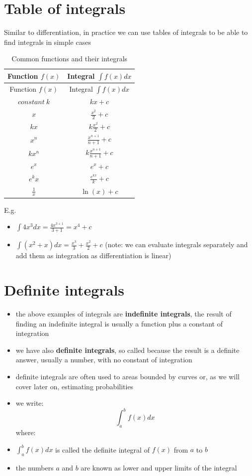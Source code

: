 \documentclass[
]{book}
\providecommand{\tightlist}{%
  \setlength{\itemsep}{0pt}\setlength{\parskip}{0pt}}
\theoremstyle{definition}
\theoremstyle{definition}
\theoremstyle{definition}
\theoremstyle{remark}
\begin{document}
\hypertarget{table-of-integrals}{%
\section{Table of integrals}\label{table-of-integrals}}

Similar to differentiation, in practice we can use tables of integrals to be able to find integrals in simple cases

\begin{longtable}[]{@{}cc@{}}
\caption{\label{tab:int-table} Common functions and their integrals}\tabularnewline
\toprule
Function \(f(x)\) & Integral \(\int f(x) dx\)\tabularnewline
\midrule
\endfirsthead
\toprule
Function \(f(x)\) & Integral \(\int f(x) dx\)\tabularnewline
\midrule
\endhead
\(constant\:k\) & \(kx + c\)\tabularnewline
\(x\) & \(\frac{x^2}{2}+c\)\tabularnewline
\(kx\) & \(k\frac{x^2}{2}+c\)\tabularnewline
\(x^n\) & \(\frac{x^{n+1}}{n+1}+c\)\tabularnewline
\(kx^n\) & \(k\frac{x^{n+1}}{n+1}+c\)\tabularnewline
\(e^x\) & \(e^x+c\)\tabularnewline
\(e^kx\) & \(\frac{e^{kx}}{k}+c\)\tabularnewline
\(\frac{1}{x}\) & \(\ln(x)+c\)\tabularnewline
\bottomrule
\end{longtable}

E.g.

\begin{itemize}
\tightlist
\item
  \(\int 4x^3 dx = \frac{4x^{3+1}}{3+1}=x^4 + c\)
\item
  \(\int (x^2 + x) dx = \frac{x^3}{3} + \frac{x^2}{2} +c\) (note: we can evaluate integrals separately and add them as integration as differentiation is linear)
\end{itemize}

\hypertarget{definite-integrals}{%
\section{Definite integrals}\label{definite-integrals}}

\begin{itemize}
\item
  the above examples of integrals are \textbf{indefinite integrals}, the result of finding an indefinite integral is usually a function plus a constant of integration
\item
  we have also \textbf{definite integrals}, so called because the result is a definite answer, usually a number, with no constant of integration
\item
  definite integrals are often used to areas bounded by curves or, as we will cover later on, estimating probabilities
\item
  we write: \[\int_{a}^bf(x)dx\] where:
\item
  \(\int_{a}^bf(x)dx\) is called the definite integral of \(f(x)\) from \(a\) to \(b\)
\item
  the numbers \(a\) and \(b\) are known as lower and upper limits of the integral
\end{itemize}
\end{document}
